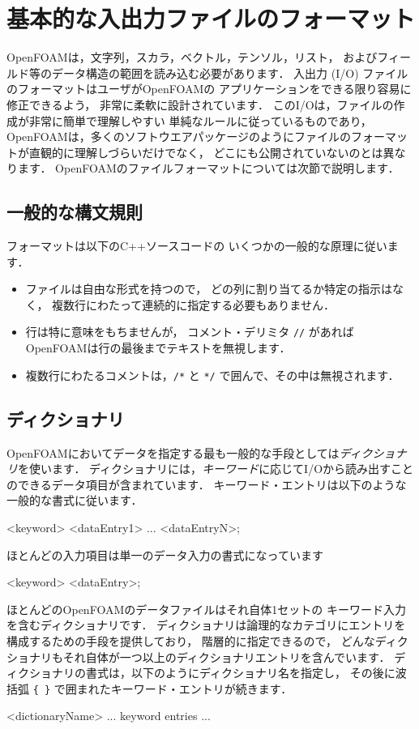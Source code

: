 \section{基本的な入出力ファイルのフォーマット}
\label{sec:4.2}
%
%
OpenFOAMは，文字列，スカラ，ベクトル，テンソル，リスト，
およびフィールド等のデータ構造の範囲を読み込む必要があります．
入出力 (I/O) ファイルのフォーマットはユーザがOpenFOAMの
アプリケーションをできる限り容易に修正できるよう，
非常に柔軟に設計されています．
このI/Oは，ファイルの作成が非常に簡単で理解しやすい
単純なルールに従っているものであり，
OpenFOAMは，多くのソフトウエアパッケージのようにファイルのフォーマットが直観的に理解しづらいだけでなく，
どこにも公開されていないのとは異なります．
OpenFOAMのファイルフォーマットについては次節で説明します．


\subsection{一般的な構文規則}
\label{ssec:4.2.1}
フォーマットは以下のC++ソースコードの
いくつかの一般的な原理に従います．
\begin{itemize}
 \item ファイルは自由な形式を持つので，
       どの列に割り当てるか特定の指示はなく，
       複数行にわたって連続的に指定する必要もありません．
 \item 行は特に意味をもちませんが，
%
%
       コメント・デリミタ \verb|//| があればOpenFOAMは行の最後までテキストを無視します．
 \item 複数行にわたるコメントは，\verb|/*| と \verb|*/| で囲んで、その中は無視されます．
\end{itemize}


\subsection{ディクショナリ}
\label{ssec:4.2.2}
OpenFOAMにおいてデータを指定する最も一般的な手段としては\emph{ディクショナリ}を使います．
ディクショナリには，\emph{キーワード}に応じてI/Oから読み出すことのできるデータ項目が含まれています．
キーワード・エントリは以下のような一般的な書式に従います．
\begin{OFverbatim}[file]
<keyword>  <dataEntry1> ... <dataEntryN>;
\end{OFverbatim}
ほとんどの入力項目は単一のデータ入力の書式になっています
\begin{OFverbatim}[file]
<keyword>  <dataEntry>;
\end{OFverbatim}
ほとんどのOpenFOAMのデータファイルはそれ自体1セットの
キーワード入力を含むディクショナリです．
ディクショナリは論理的なカテゴリにエントリを構成するための手段を提供しており，
階層的に指定できるので，
どんなディクショナリもそれ自体が一つ以上のディクショナリエントリを含んでいます．
ディクショナリの書式は，以下のようにディクショナリ名を指定し，
その後に波括弧 \verb|{ }| で囲まれたキーワード・エントリが続きます．
\begin{OFverbatim}[file]
<dictionaryName>
{
    ... keyword entries ...
}
\end{OFverbatim}


